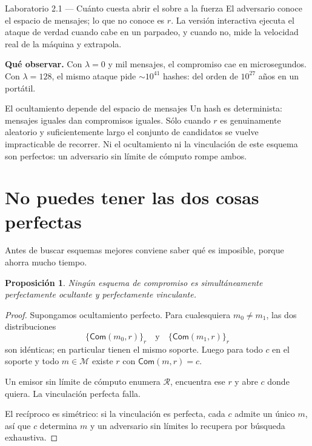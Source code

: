 \documentclass[11pt,a4paper]{article}
\theoremstyle{definition}
\theoremstyle{plain}
\newtheorem{proposicion}{Proposición}
\theoremstyle{remark}
\newcommand{\Com}{\mathsf{Com}}
\begin{document}
\begin{laboratorio}{Laboratorio 2.1 — Cuánto cuesta abrir el sobre a la fuerza}
El adversario conoce el espacio de mensajes; lo que no conoce es $r$. La versión
interactiva ejecuta el ataque de verdad cuando cabe en un parpadeo, y cuando no,
mide la velocidad real de la máquina y extrapola.

\textbf{Qué observar.} Con $\lambda = 0$ y mil mensajes, el compromiso cae en
microsegundos. Con $\lambda = 128$, el mismo ataque pide $\sim 10^{41}$ hashes:
del orden de $10^{27}$ años en un portátil.
\end{laboratorio}

\begin{aviso}{El ocultamiento depende del espacio de mensajes}
Un hash es determinista: mensajes iguales dan compromisos iguales. Sólo cuando
$r$ es genuinamente aleatorio y suficientemente largo el conjunto de candidatos
se vuelve impracticable de recorrer. Ni el ocultamiento ni la vinculación de este
esquema son perfectos: un adversario sin límite de cómputo rompe ambos.
\end{aviso}

\section{No puedes tener las dos cosas perfectas}
\label{sec:imposibilidad}

Antes de buscar esquemas mejores conviene saber qué es imposible, porque ahorra
mucho tiempo.

\begin{proposicion}\label{prop:imposible}
Ningún esquema de compromiso es simultáneamente perfectamente ocultante y
perfectamente vinculante.
\end{proposicion}

\begin{proof}
Supongamos ocultamiento perfecto. Para cualesquiera $m_0 \neq m_1$, las dos
distribuciones
\[
  \{\Com(m_0,r)\}_{r} \quad\text{y}\quad \{\Com(m_1,r)\}_{r}
\]
son idénticas; en particular tienen el mismo soporte. Luego para todo $c$ en el
soporte y todo $m \in \mathcal{M}$ existe $r$ con $\Com(m,r) = c$.

Un emisor sin límite de cómputo enumera $\mathcal{R}$, encuentra ese $r$ y abre
$c$ donde quiera. La vinculación perfecta falla.

El recíproco es simétrico: si la vinculación es perfecta, cada $c$ admite un
único $m$, así que $c$ determina $m$ y un adversario sin límites lo recupera por
búsqueda exhaustiva.
\end{proof}
\end{document}
